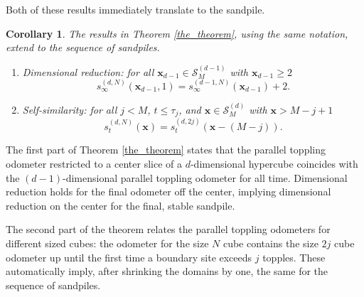 \documentclass[12pt]{amsart}
\newtheorem{corollary}{Corollary}[section]
\begin{document}
	Both of these results immediately translate to the sandpile. 
	\begin{corollary} 
	
		The results in Theorem \ref{the_theorem}, using the same notation, extend to the sequence of sandpiles. 	
		\begin{enumerate}
			\item{Dimensional reduction:} for all $\mathbf{x}_{d-1} \in \mathcal{S}_M^{(d-1)}$ with $\mathbf{x}_{d-1} \geq 2$
			\[
			s_{\infty}^{(d,N)}(\mathbf{x}_{d-1},1)  = s_{\infty}^{(d-1,N)}(\mathbf{x}_{d-1})+2.
			\]
			\item{Self-similarity:} for all $j < M$, $t \leq \tau_j$, and $\mathbf{x} \in \mathcal{S}_M^{(d)}$ with $\mathbf{x} > M-j+1$
			\[
			s_t^{(d,N)}(\mathbf{x}) = s_t^{(d,2 j)}(\mathbf{x}-(M-j)).
			\]
			\end{enumerate}

	\end{corollary}
	
	The first part of Theorem \ref{the_theorem} states that the parallel toppling odometer restricted to a center slice of a $d$-dimensional hypercube coincides 
	with the $(d-1)$-dimensional parallel toppling odometer for all time.  Dimensional reduction holds for the final odometer off the center, implying dimensional reduction 
	on the center for the final, stable sandpile. 
	
	The second part of the theorem relates the parallel toppling odometers for different sized cubes: 
	the odometer for the size $N$ cube contains the size $2 j$ cube odometer up until the first time a boundary site exceeds $j$ topples. These automatically imply, after shrinking the domains by one, the same for the sequence of sandpiles.
	
	
	
	
	
\end{document}

